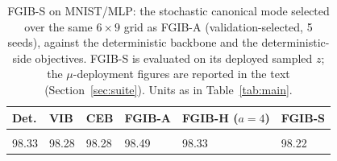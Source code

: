 \begin{table}[t]
\caption{FGIB-S on MNIST/MLP: the stochastic canonical mode selected over the same $6\times9$ grid as FGIB-A (validation-selected, 5 seeds), against the deterministic backbone and the deterministic-side objectives. FGIB-S is evaluated on its deployed sampled $z$; the $\mu$-deployment figures are reported in the text (Section~\ref{sec:suite}). Units as in Table~\ref{tab:main}.}
\label{tab:fgibs-mnist}
\begin{center}\footnotesize
\begin{tabular}{llllll}
Det. & VIB & CEB & FGIB-A & FGIB-H ($a{=}4$) & FGIB-S \\ \hline \\[-1.8ex]
98.33 & 98.28 & 98.28 & 98.49 & 98.33 & 98.22 \\
\end{tabular}\end{center}\end{table}

